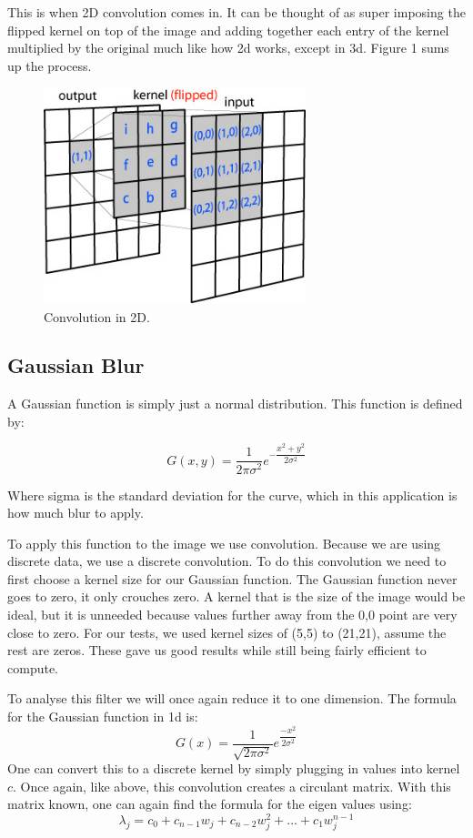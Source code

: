 \documentclass[11pt]{article}
\begin{document}
This is when 2D convolution comes in. It can be thought of as super imposing the flipped kernel on top of the image and adding together each entry of the kernel multiplied by the original much like how 2d works, except in 3d.
Figure 1 sums up the process.

\begin{figure}[Htp]
\includegraphics[width=3in]{conv2d_matrix.jpg}
\caption{Convolution in 2D.}
\label{}
\end{figure}

\subsection{Gaussian Blur}
A Gaussian function is simply just a normal distribution. This function is defined by:

$$
G(x,y) = \dfrac{1}{2\pi \sigma^2}e^{-\dfrac{x^2+y^2}{2 \sigma^2}}$$

Where sigma is the standard deviation for the curve, which in this application is how much blur to apply.

To apply this function to the image we use convolution. Because we are using discrete data, we use a discrete convolution. To do this convolution we need to first choose a kernel size for our Gaussian function. The Gaussian function never goes to zero, it only crouches zero. A kernel that is the size of the image would be ideal, but it is unneeded because values further away from the 0,0 point are very close to zero. For our tests, we used kernel sizes of (5,5) to (21,21), assume the rest are zeros. These gave us good results while still being fairly efficient to compute. 

To analyse this filter we will once again reduce it to one dimension. The formula for the Gaussian function in 1d is:  
$$ G(x) = \dfrac{1}{\sqrt{2\pi \sigma^2}}e^{\dfrac{-x^2}{2\sigma^2}} $$
One can convert this to a discrete kernel by simply plugging in values into kernel $c$.
Once again, like above, this convolution creates a circulant matrix. With this matrix known, one can again find the formula for the eigen values using:
$$\lambda_j = c_0+c_{n-1}w_j+c_{n-2}w_j^2 + ... + c_1w_j^{n-1}$$
\end{document}
